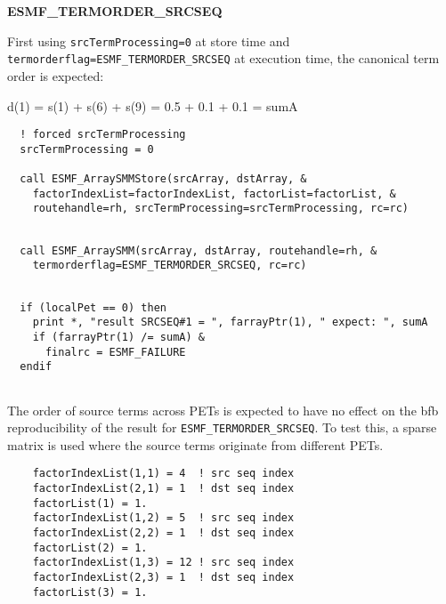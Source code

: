    {\bf ESMF\_TERMORDER\_SRCSEQ}
   
   First using {\tt srcTermProcessing=0} at store time and
   {\tt termorderflag=ESMF\_TERMORDER\_SRCSEQ} at execution time,
   the canonical term order is expected:
  
       d(1) = s(1) + s(6) + s(9) = 0.5 + 0.1 + 0.1 = sumA
   

 \begin{verbatim}
  ! forced srcTermProcessing
  srcTermProcessing = 0
  
  call ESMF_ArraySMMStore(srcArray, dstArray, &
    factorIndexList=factorIndexList, factorList=factorList, &
    routehandle=rh, srcTermProcessing=srcTermProcessing, rc=rc)
 
\end{verbatim}
 

 \begin{verbatim}
  call ESMF_ArraySMM(srcArray, dstArray, routehandle=rh, &
    termorderflag=ESMF_TERMORDER_SRCSEQ, rc=rc)
 
\end{verbatim}
 

 \begin{verbatim}
  if (localPet == 0) then
    print *, "result SRCSEQ#1 = ", farrayPtr(1), " expect: ", sumA
    if (farrayPtr(1) /= sumA) &
      finalrc = ESMF_FAILURE
  endif
 
\end{verbatim}
 

   The order of source terms across PETs is expected to have no effect on the
   bfb reproducibility of the result for {\tt ESMF\_TERMORDER\_SRCSEQ}. To test
   this, a sparse matrix is used where the source terms originate from different
   PETs. 

 \begin{verbatim}
    factorIndexList(1,1) = 4  ! src seq index
    factorIndexList(2,1) = 1  ! dst seq index
    factorList(1) = 1.
    factorIndexList(1,2) = 5  ! src seq index
    factorIndexList(2,2) = 1  ! dst seq index
    factorList(2) = 1.
    factorIndexList(1,3) = 12 ! src seq index
    factorIndexList(2,3) = 1  ! dst seq index
    factorList(3) = 1.
 
\end{verbatim}
 

